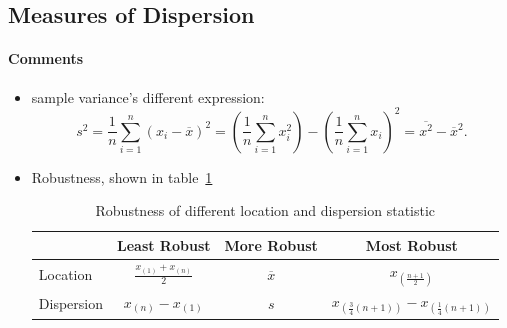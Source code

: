 \documentclass[12pt]{report}
\theoremstyle{definition}
\begin{document}
\subsection{Measures of Dispersion}

\noindent{}
\paragraph{Comments}
\begin{itemize}
        \item sample variance's different expression:
            \[
                s^{2} = \frac{1}{n}\sum_{i=1}^{n} {(x_i-\overline{x})}^{2}
                = \left(\frac{1}{n}\sum_{i=1}^{n} x_i^2\right)
                - {\left(\frac{1}{n}\sum_{i=1}^{n} x_i\right)}^{2}
                = \overline{x^{2}}-\overline{x}^{2}.
            \]
        \item Robustness, shown in table~\ref{robustness}
            \begin{table}[h]
                \centering
                \caption{Robustness of different location and dispersion statistic}
                \label{robustness}
                \begin{tabular}{l||c|c|c}
                    & Least Robust & More Robust & Most Robust \\
                    \hline\hline
                    Location & $\frac{x_{(1)}+x_{(n)}}{2}$ & $\overline{x}$ &
                    $x_{\left(\frac{n+1}{2}\right)}$ \\
                    \hline
                    Dispersion & $x_{(n)}-x_{(1)}$ & $s$ &
                    $x_{\left(\frac{3}{4}(n+1)\right)}-x_{\left(\frac{1}{4}(n+1)\right)}$
                \end{tabular} 
            \end{table} 
\end{itemize} 
\end{document}
